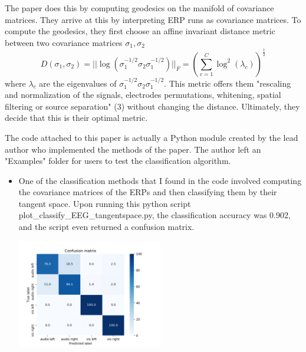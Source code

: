 \documentclass[12pt,letterpaper,boxed]{math_hw_pset}
\begin{document}
\begin{solution}
    The paper does this by computing geodesics on the manifold of covariance matrices. 
    They arrive at this by interpreting ERP runs as covariance matrices.
    To compute the geodesics, they first 
    choose an affine invariant distance metric between two covariance matrices $\sigma_1, \sigma_2$ 
    \[
        D(\sigma_1,  \sigma_2) = ||\log(\sigma_1^{-1/2}\sigma_2\sigma_1^{-1/2})||_F = \left(\sum_{c = 1}^{C} \log^2(\lambda_c) \right)^{\frac{1}{2}}
    \] 
    where $\lambda_c$ are the eigenvalues of $\sigma_1^{-1/2}\sigma_2\sigma_1^{-1/2}$. 
    This metric offers them 
    "rescaling and normalization of the signals, electrodes permutations, whitening,
    spatial filtering or source separation" (3) without changing the distance. Ultimately, they decide 
    that this is their optimal metric.  

    The code attached to this paper is actually a Python module created by the lead author who implemented 
    the methods of the paper. The author left an "Examples" folder for users to test the classification algorithm. 
    \begin{itemize}
        \item One of the classification methods that I found in the code involved computing the  
        covariance matrices of the ERPs and then classifying them by their tangent space. Upon running this 
        python script plot\_classify\_EEG\_tangentspace.py, the classification accuracy was 
        0.902, and the script even returned a confusion matrix. 
        \begin{center}
            \includegraphics[width = 0.5\textwidth]{plot_classify_tangentspace.png}
        \end{center}


\end{itemize}
\end{solution}
\end{document}
